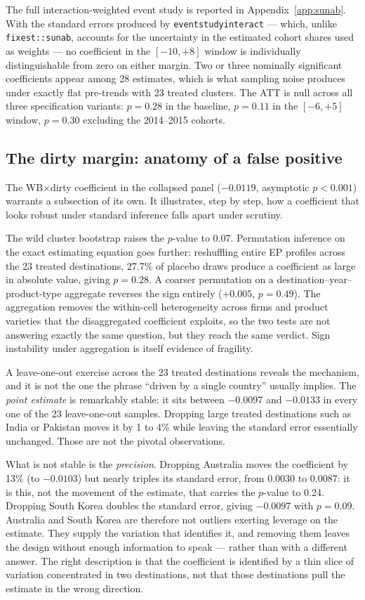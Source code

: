 \documentclass[12pt]{article}
\begin{document}
The full interaction-weighted event study is reported in Appendix~\ref{app:sunab}. With
the standard errors produced by \texttt{eventstudyinteract} --- which, unlike
\texttt{fixest::sunab}, accounts for the uncertainty in the estimated cohort shares used
as weights --- no coefficient in the $[-10, +8]$ window is individually distinguishable
from zero on either margin. Two or three nominally significant coefficients appear among
28 estimates, which is what sampling noise produces under exactly flat pre-trends with 23
treated clusters. The ATT is null across all three specification variants: $p = 0.28$ in
the baseline, $p = 0.11$ in the $[-6, +5]$ window, $p = 0.30$ excluding the 2014--2015
cohorts.

\subsection{The dirty margin: anatomy of a false positive}\label{sec:dirty}

The WB$\times$dirty coefficient in the collapsed panel ($-0.0119$, asymptotic $p < 0.001$)
warrants a subsection of its own. It illustrates, step by step, how a coefficient that
looks robust under standard inference falls apart under scrutiny.

The wild cluster bootstrap raises the $p$-value to 0.07. Permutation inference on the
exact estimating equation goes further: reshuffling entire EP profiles across the 23
treated destinations, 27.7\% of placebo draws produce a coefficient as large in absolute
value, giving $p = 0.28$. A coarser permutation on a destination--year--product-type
aggregate reverses the sign entirely ($+0.005$, $p = 0.49$). The aggregation removes the
within-cell heterogeneity across firms and product varieties that the disaggregated
coefficient exploits, so the two tests are not answering exactly the same question, but
they reach the same verdict. Sign instability under aggregation is itself evidence of
fragility.

A leave-one-out exercise across the 23 treated destinations reveals the mechanism, and it
is not the one the phrase ``driven by a single country'' usually implies. The
\emph{point estimate} is remarkably stable: it sits between $-0.0097$ and $-0.0133$ in
every one of the 23 leave-one-out samples. Dropping large treated destinations such as
India or Pakistan moves it by 1 to 4\% while leaving the standard error essentially
unchanged. Those are not the pivotal observations.

What is not stable is the \emph{precision}. Dropping Australia moves the coefficient by
13\% (to $-0.0103$) but nearly triples its standard error, from 0.0030 to 0.0087: it is
this, not the movement of the estimate, that carries the $p$-value to 0.24. Dropping
South Korea doubles the standard error, giving $-0.0097$ with $p = 0.09$. Australia and
South Korea are therefore not outliers exerting leverage on the estimate. They supply the
variation that identifies it, and removing them leaves the design without enough
information to speak --- rather than with a different answer. The right description is
that the coefficient is identified by a thin slice of variation concentrated in two
destinations, not that those destinations pull the estimate in the wrong direction.
\end{document}
